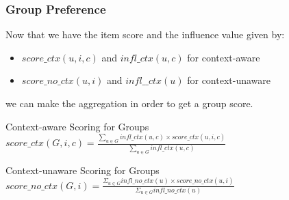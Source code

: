 \begin{frame}
	\frametitle{Group Preference}
	Now that we have the item score and the influence value given by:
	\begin{itemize}
	\item $score\_ctx(u,i,c)$ and $infl\_ctx(u,c)$ for context-aware
	\item $score\_no\_ctx(u,i)$ and $infl\_\_ctx(u)$ for context-unaware
	\end{itemize}	  
	we can make the aggregation in order to get a group score. 
	\begin{block}{\small Context-aware Scoring for Groups}
		\centering
		$score\_ctx(G,i,c) = \frac{\sum_{u \in G} infl\_ctx(u,c) \times score\_ctx(u,i,c)}{\sum_{u \in G} infl\_ctx(u,c)}$
	\end{block}
	
		\begin{block}{\small Context-unaware Scoring for Groups}
		\centering
		$score\_no\_ctx(G,i) = \frac{\Sigma_{u \in G} infl\_no\_ctx(u) \times score\_no\_ctx(u,i)}{\Sigma_{u \in G} infl\_no\_ctx(u)}$
	\end{block}
	
\end{frame}

